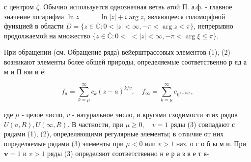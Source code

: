 \documentclass[10pt]{article}
\begin{document}
с центром $\zeta$. Обычно используется однозначная ветвь әтой П. а.ф. - главное значение логарифма $\ln z=$ $=\ln |z|+i \arg z$, являющееся голоморфной функцией в области $D=\{z \in \overline{\mathbb{C}}: 0<|z|<\infty,-\pi<\arg z<\pi\}$, непрерывно продолжаемой на множество $\{z \in \overline{\mathbb{C}}: 0<$ $<|z|<\infty,-\pi<\arg \xi \leqslant \pi\}$.



При обращении (см. Обращение ряда) вейерштрассовых элементов (1), (2) возникают элементы более общей природы, определяемые соответственно р яд а м и П юи и ё:



\[

f_{a}=\sum_{k=\mu}^{\infty} c_{k}(z-a)^{k / v}, \quad f_{\infty}=\sum_{k=\mu}^{\infty} c_{k^{z-k / v}},

\]



где $\mu$ - целое число, $v$ - натуральное число, и кругами сходимости этих рядов $U(a, R), U(\infty, R)$. В частности, при $\mu \geqslant 0, \quad v=1$ ряды (3) совпадают с рядами (1), (2), определяющими регулярные элементы; в отличие от них определяемые рядами (3) элементы при $\mu<0$ или $v>1$ наз. о с о б ы м и. При $\boldsymbol{v}=1$ и $v>1$ ряды (3) определяют соответственно н е р а з в е т в-
\end{document}
